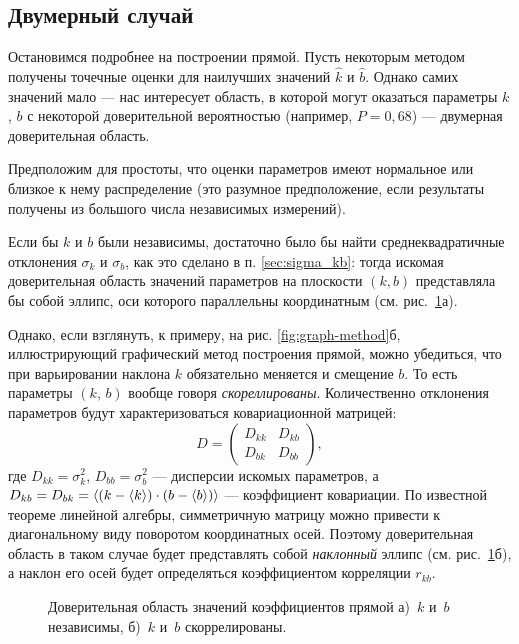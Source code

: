 \subsection{Двумерный случай}
Остановимся подробнее на построении прямой. Пусть некоторым методом получены
точечные оценки для наилучших значений $\hat{k}$ и $\hat{b}$.
Однако самих значений мало --- нас интересует область, в которой могут
оказаться параметры $k$, $b$ с некоторой доверительной вероятностью
(например, $P=0,68$) --- двумерная доверительная область.

Предположим для простоты, что оценки параметров имеют нормальное или близкое
к нему распределение (это разумное предположение, если результаты получены
из большого числа независимых измерений).

Если бы $k$ и $b$ были независимы, достаточно было бы найти среднеквадратичные
отклонения $\sigma_k$ и $\sigma_b$, как это сделано в п. \ref{sec:sigma_kb}:
тогда искомая доверительная область значений параметров на плоскости $(k,b)$
представляла бы собой эллипс, оси которого параллельны координатным
(см. рис.~\ref{fig:kb}а).

Однако, если взглянуть, к примеру, на рис. \ref{fig:graph-method}б, иллюстрирующий
графический метод построения прямой, можно убедиться, что при варьировании
наклона $k$ обязательно меняется и смещение $b$. То есть параметры
$(k,\,b)$ вообще говоря \emph{скореллированы}. Количественно отклонения параметров
будут характеризоваться ковариационной матрицей:
\[
D = \left(\begin{matrix}
    D_{kk} & D_{kb} \\
    D_{bk} & D_{bb}
\end{matrix}\right),
\]
где $D_{kk}=\sigma_k^2$, $D_{bb}=\sigma_b^2$ --- дисперсии искомых параметров,
а $D_{kb}=D_{bk} = \left<(k-\left<k\right>)\cdot(b-\left<b\right>)\right>$ ---
коэффициент ковариации.
По известной теореме линейной алгебры, симметричную матрицу можно
привести к диагональному виду поворотом координатных осей. Поэтому доверительная
область в таком случае будет представлять собой \emph{наклонный} эллипс
(см. рис.~\ref{fig:kb}б), а наклон его осей будет определяться
коэффициентом корреляции $r_{kb}$.

\begin{figure}[h]
    \centering

\caption{Доверительная область значений коэффициентов прямой а)~$k$ и~$b$ независимы,
б)~$k$ и~$b$ скоррелированы.}
\label{fig:kb}
\end{figure}


